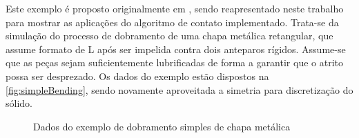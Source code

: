 \documentclass[Tese.tex]{subfiles}
\begin{document}
Este exemplo é proposto originalmente em , sendo reapresentado neste trabalho para mostrar as aplicações do algoritmo de contato implementado. Trata-se da simulação do processo de dobramento de uma chapa metálica retangular, que assume formato de L após ser impelida contra dois anteparos rígidos. Assume-se que as peças sejam suficientemente lubrificadas de forma a garantir que o atrito possa ser desprezado. Os dados do exemplo estão dispostos na \autoref{fig:simpleBending}, sendo novamente aproveitada a simetria para discretização do sólido.

\begin{figure}[!htb]
	\centering
	\caption{Dados do exemplo de dobramento simples de chapa metálica}
	\label{fig:simpleBending}
	{\small
		\noindent{}
	}	
\end{figure}
\end{document}
